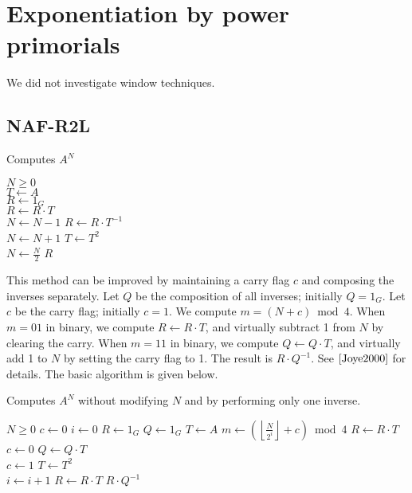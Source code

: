 \documentclass[11pt, letterpaper]{article}
\theoremstyle{definition}
\newcommand{\floor}[1]{\left\lfloor #1 \right\rfloor}
\begin{document}
\section{Exponentiation by power primorials}

We did not investigate window techniques.

\subsection{NAF-R2L}

\bigbreak
\begin{algorithm}[h!]
\caption{Computes $A^N$}
\label{NAF-R2l}
\begin{algorithmic}[1]
\REQUIRE $N \ge 0$ \\
\STATE $T \gets A$ \\
\STATE $R \gets 1_G$ \\
		\STATE $R \gets R \cdot T$ \\
		\STATE $N \gets N-1$
		\STATE $R \gets R \cdot T^{-1}$ \\
		\STATE $N \gets N+1$
	\ENDIF
	\STATE $T \gets T^2$ \\
	\STATE $N \gets \frac{N}{2}$
\ENDWHILE
\RETURN $R$
\end{algorithmic}
\end{algorithm}

\bigbreak
This method can be improved by maintaining a carry flag $c$ and composing the inverses separately.  Let $Q$ be the composition of all inverses; initially $Q=1_G$.  Let $c$ be the carry flag; initially $c=1$.  We compute $m = (N+c) \bmod 4$.  When $m = 01$ in binary, we compute $R \gets R \cdot T$, and virtually subtract 1 from $N$ by clearing the carry.  When $m = 11$ in binary, we compute $Q \gets Q \cdot T$, and virtually add 1 to $N$ by setting the carry flag to 1. The result is $R \cdot Q^{-1}$.  See $\ref{Joye2000}$ for details.  The basic algorithm is given below.

\bigbreak
\begin{algorithm}[h!]
\caption{Computes $A^N$ without modifying $N$ and by performing only one inverse.}
\label{NAF-R2l}
\begin{algorithmic}[1]
\REQUIRE $N \ge 0$
\STATE $c \gets 0$
\STATE $i \gets 0$
\STATE $R \gets 1_G$
\STATE $Q \gets 1_G$
\STATE $T \gets A$
	\STATE $m \gets \left(\floor{\frac{N}{2^i}}+c\right) \bmod 4$
		\STATE $R \gets R \cdot T$
		\STATE $c \gets 0$
		\STATE $Q \gets Q \cdot T$ \\
		\STATE $c \gets 1$
	\ENDIF
	\STATE $T \gets T^2$ \\
	\STATE $i \gets i+1$
\ENDWHILE
{} \STATE $R \gets R \cdot T$ \ENDIF
\RETURN $R \cdot Q^{-1}$
\end{algorithmic}
\end{algorithm}
\end{document}

